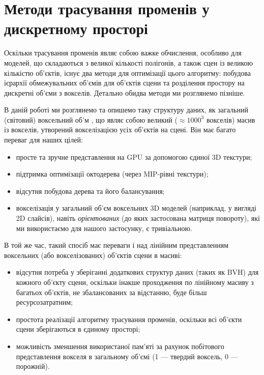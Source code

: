 \section{Методи трасування променів у дискретному просторі}
Оскільки трасування променів являє собою важке обчислення, особливо для моделей, що складаються з великої кількості полігонів, а також сцен із великою кількістю об'єктів, існує два методи для оптимізації цього алгоритму: побудова ієрархії обмежувальних об'ємів  для об'єктів сцени та розділення простору на дискретні об'єми з вокселів. Детально обидва методи ми розглянемо пізніше. \cite{discreteRT}

В даній роботі ми розглянемо та опишемо таку структуру даних, як загальний (світовий) воксельний об'м , що являє собою великий ($\approx 1000^3$ вокселів) масив із вокселів, утворений вокселізацією усіх об'єктів на сцені. Він має багато переваг для наших цілей:
\begin{itemize}[itemsep=0pt, topsep=0pt, label=$\diamond$]
    \item просте та зручне представлення на GPU за допомогою єдиної 3D текстури;
    \item підтримка оптимізації октодерева (через MIP-рівні текстури);
    \item відсутня побудова дерева та його балансування;
    \item вокселізація у загальний об'єм воксельних 3D моделей (наприклад, \linebreak у вигляді 2D слайсів), навіть \textit{орієнтованих} (до яких застосована матриця повороту), які ми використаємо для нашого застосунку, є тривіальною.
\end{itemize}

В той же час, такий спосіб має переваги і над лінійним представленням воксельних (або вокселізованих) об'єктів сцени в масиві:
\begin{itemize}[itemsep=0pt, topsep=0pt, label=$\diamond$]
    \item відсутня потреба у зберіганні додаткових структур даних (таких як BVH) для кожного об'єкту сцени, оскільки інакше проходження по лінійному масиву з багатьох об'єктів, не збалансованих за відстанню, буде більш ресурсозатратним;
    \item простота реалізації алгоритму трасування променів, оскільки всі об'єк\-ти сцени зберігаються в єдиному просторі;
    \item можливість зменшення використаної пам'яті за рахунок побітового \linebreak представлення вокселя в загальному об'ємі (1 --- твердий воксель, 0 --- порожній).
\end{itemize}


